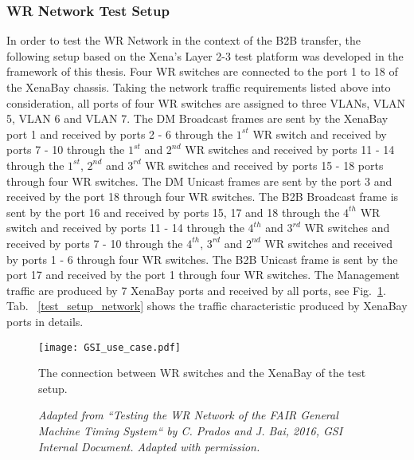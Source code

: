 \subsubsection{WR Network Test Setup}
In order to test the WR Network in the context of the B2B transfer, the following setup based on the Xena's Layer 2-3 test platform was developed in the framework of this thesis. Four WR switches are connected to the port 1 to 18 of the XenaBay chassis. Taking the network traffic requirements listed above into consideration, all ports of four WR switches are assigned to three VLANs, VLAN 5, VLAN 6 and VLAN 7. The DM Broadcast frames are sent by the XenaBay port 1 and received by ports 2 - 6 through the $1^{st}$ WR switch and received by ports 7 - 10 through the $1^{st}$ and $2^{nd}$ WR switches and received by ports 11 - 14 through the $1^{st}$, $2^{nd}$ and $3^{rd}$ WR switches and received by ports 15 - 18 ports through four WR switches. The DM Unicast frames are sent by the port 3 and received by the port 18 through four WR switches. The B2B Broadcast frame is sent by the port 16 and received by ports 15, 17 and 18 through the $4^{th}$ WR switch and received by ports 11 - 14 through the $4^{th}$ and $3^{rd}$ WR switches and received by ports 7 - 10 through the $4^{th}$, $3^{rd}$ and $2^{nd}$ WR switches and received by ports 1 - 6 through four WR switches. The B2B Unicast frame is sent by the port 17 and received by the port 1 through four WR switches. The Management traffic are produced by 7 XenaBay ports and received by all ports, see Fig.~\ref{GSI_use_case.jpg}.  Tab. ~\ref{test_setup_network} shows the traffic characteristic produced by XenaBay ports in details. 
\begin{figure}[H]
   \centering   
   \texttt{[image: GSI\_use\_case.pdf]}
   \caption{The connection between WR switches and the XenaBay of the test setup.}
    \caption*{\textsl{\small{Adapted from ``Testing the WR Network of the FAIR General Machine Timing System`` by C. Prados and J. Bai, 2016, GSI Internal Document. Adapted with permission.}}}
   \label{GSI_use_case.jpg}
\end{figure}

